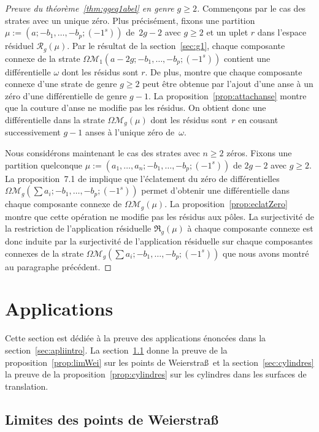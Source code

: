 \documentclass[11pt]{article}
\numberwithin{equation}{section}\renewcommand{\proofname}{Démonstration}
\let\mathcal\mathscr
\newcommand{\appres}[1][g]{\mathfrak{R}_{#1}}
\newcommand{\espres}[1][g]{\mathcal{R}_{#1}}
\newcommand{\omoduli}[1][g]{{\Omega\mathcal M}_{\!#1}}
\theoremstyle{definition}
\begin{document}
\begin{proof}[Preuve du théorème~\ref{thm:ggeq1abel} en genre $g\geq2$]
Commençons par le cas des strates avec un unique zéro. Plus précisément, fixons une partition $\mu:=(a;-b_{1},\dots,-b_{p};(-1^{s}))$ de~$2g-2$ avec $g\geq2$ et un uplet $r$ dans l'espace résiduel $\espres(\mu)$. Par le résultat de la section~\ref{sec:g1}, chaque composante connexe de la strate $\omoduli[1](a-2g;-b_{1},\dots,-b_{p};(-1^{s}))$ contient une différentielle $\omega$ dont les résidus sont $r$. De plus, \cite[Prop.\,6.1]{Bo} montre que chaque composante connexe d'une strate de genre $g \geq 2$ peut être obtenue par l'ajout d'une anse à un zéro d'une différentielle de genre $g-1$. La proposition~\ref{prop:attachanse} montre que la couture d'anse ne modifie pas les résidus. On obtient donc une différentielle dans la strate $\omoduli[g](\mu)$ dont les résidus sont~$r$ en cousant successivement $g-1$ anses à l'unique zéro de~$\omega$.

Nous considérons maintenant le cas des strates avec $n\geq 2$ zéros. Fixons une partition quelconque $\mu:=(a_{1},\ldots,a_{n};-b_{1},\dots,-b_{p};(-1^{s}))$ de $2g-2$ avec $g\geq2$.
La proposition~7.1 de \cite{Bo} implique que l'éclatement du zéro de différentielles $\omoduli[g](\sum a_{i};-b_{1},\dots,-b_{p};(-1^{s}))$ permet d'obtenir une différentielle dans chaque composante connexe de $\omoduli(\mu)$. La proposition~\ref{prop:eclatZero} montre que cette opération ne modifie pas les résidus aux pôles. La surjectivité de la restriction de l'application résiduelle $\appres(\mu)$ à chaque composante connexe est donc induite par la surjectivité de l'application résiduelle sur chaque composantes connexes de la strate $\omoduli[g](\sum a_{i};-b_{1},\dots,-b_{p};(-1^{s}))$ que nous avons montré au paragraphe précédent.
\end{proof}

\section{Applications}
\label{sec:appli}

Cette section est dédiée à la preuve des applications énoncées dans la section~\ref{sec:apliintro}. La section~\ref{sec:limwei} donne la preuve de la proposition~\ref{prop:limWei} sur les points de Weierstra\ss~et la section~\ref{sec:cylindres} la preuve de la proposition~\ref{prop:cylindres} sur les cylindres dans les surfaces de translation.

\subsection{Limites des points de Weierstra{\normalfont\ss}}
\label{sec:limwei}
\end{document}
